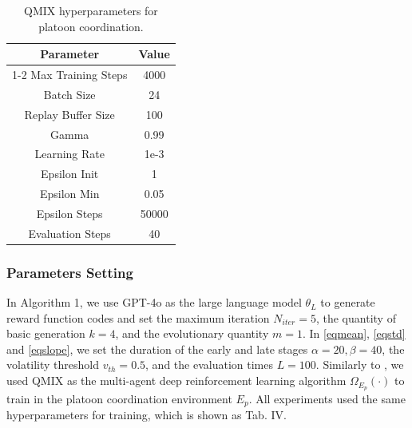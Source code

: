 \documentclass[lettersize,journal]{IEEEtran}
\begin{document}
\begin{table}[h]
\centering
\caption{QMIX hyperparameters for platoon coordination.}
\begin{tabular}{cc}
\toprule
Parameter          & Value \\
\cmidrule(r){1-2}
Max Training Steps & 4000  \\
Batch Size         & 24    \\
Replay Buffer Size & 100   \\
Gamma              & 0.99  \\
Learning Rate      & 1e-3  \\
Epsilon Init       & 1     \\
Epsilon Min        & 0.05  \\
Epsilon Steps      & 50000 \\
Evaluation Steps   & 40   \\ \bottomrule
\end{tabular}
\end{table}

\subsubsection{Parameters Setting}
In Algorithm 1, we use GPT-4o as the large language model $\theta_L$ to generate reward function codes and set the maximum iteration $N_{iter}=5$, the quantity of basic generation $k=4$, and the evolutionary quantity $m=1$.
In \eqref{eqmean}, \eqref{eqstd} and \eqref{eqslope}, we set the duration of the early and late stages $\alpha=20, \beta=40$, the volatility threshold $v_{th}=0.5$, and the evaluation times $L=100$.
Similarly to \cite{wei2023multi,wei2024multi}, we used QMIX as the multi-agent deep reinforcement learning algorithm $\Omega_{E_p}(\cdot)$ to train in the platoon coordination environment $E_p$. All experiments used the same hyperparameters for training, which is shown as Tab. IV.
\end{document}
